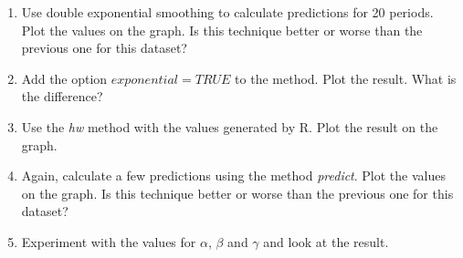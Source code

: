 \begin{exercise}
\begin{enumerate}
    \item Use double exponential smoothing to calculate predictions for 20 periods. Plot the values on the graph. Is this technique better or worse than the previous one for this dataset?
    \item Add the option $exponential=TRUE$ to the method. Plot the result. What is the difference?
    \item Use the \emph{hw} method with the values generated by R. Plot the result on the graph.
    \item Again, calculate a few predictions using the method \emph{predict}. Plot the values on the graph. Is this technique better or worse than the previous one for this dataset?
    \item Experiment with the values for $\alpha$, $\beta$ and $\gamma$ and look at the result.
  \end{enumerate}
  
  \end{exercise}

